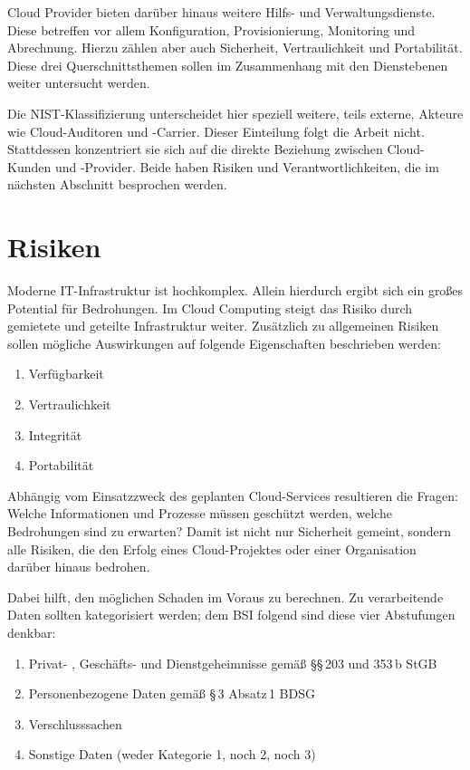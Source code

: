 \noindent
Cloud Provider bieten darüber hinaus weitere Hilfs- und Verwaltungsdienste. Diese betreffen vor allem Konfiguration, Provisionierung, Monitoring und Abrechnung. Hierzu zählen aber auch Sicherheit, Vertraulichkeit und Portabilität. Diese drei Querschnittsthemen sollen im Zusammenhang mit den Dienstebenen weiter untersucht werden.

Die NIST-Klassifizierung unterscheidet hier speziell weitere, teils externe, Akteure wie Cloud-Auditoren und -Carrier. Dieser Einteilung folgt die Arbeit nicht. Stattdessen konzentriert sie sich auf die direkte Beziehung zwischen Cloud-Kunden und -Provider. Beide haben Risiken und Verantwortlichkeiten, die im nächsten Abschnitt besprochen werden.

\section{Risiken}

Moderne IT-Infrastruktur ist hochkomplex. Allein hierdurch ergibt sich ein großes Potential für Bedrohungen. Im Cloud Computing steigt das Risiko durch gemietete und geteilte Infrastruktur weiter. Zusätzlich zu allgemeinen Risiken sollen mögliche Auswirkungen auf folgende Eigenschaften beschrieben werden:

\begin{enumerate}
	\item Verfügbarkeit
	\item Vertraulichkeit
	\item Integrität
	\item Portabilität
\end{enumerate}

\noindent
Abhängig vom Einsatzzweck des geplanten Cloud-Services resultieren die Fragen: Welche Informationen und Prozesse müssen geschützt werden, welche Bedrohungen sind zu erwarten? Damit ist nicht nur Sicherheit gemeint, sondern alle Risiken, die den Erfolg eines Cloud-Projektes oder einer Organisation darüber hinaus bedrohen.

Dabei hilft, den möglichen Schaden im Voraus zu berechnen. Zu verarbeitende Daten sollten kategorisiert werden; dem BSI folgend sind diese vier Abstufungen denkbar:

\begin{enumerate}
	\item Privat- , Geschäfts- und Dienstgeheimnisse gemäß §§\,203 und 353\,b StGB
	\item Personenbezogene Daten gemäß §\,3 Absatz\,1 BDSG
	\item Verschlusssachen
	\item Sonstige Daten (weder Kategorie 1, noch 2, noch 3)	
\end{enumerate}

